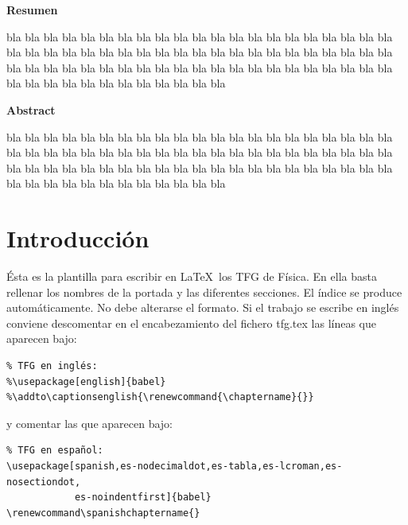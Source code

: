 \documentclass[11pt,a4paper,twoside,pdf]{article}
\numberwithin{equation}{section}
\renewcommand\spanishchaptername{}
\begin{document}
\begin{center}

{\bf Resumen}
\bigskip

\begin{minipage}{0.8\linewidth}
bla bla bla bla bla bla bla bla bla bla bla bla bla bla bla
bla bla bla bla bla bla bla bla bla bla bla bla bla bla bla
bla bla bla bla bla bla bla bla bla bla bla bla bla bla bla 
bla bla bla bla bla bla bla bla bla bla bla bla bla bla bla
bla bla bla bla bla bla bla bla bla bla bla bla bla bla bla
\end{minipage}

\vfill

{\bf Abstract} 
\bigskip

\begin{minipage}{0.8\linewidth}
bla bla bla bla bla bla bla bla bla bla bla bla bla bla bla
bla bla bla bla bla bla bla bla bla bla bla bla bla bla bla
bla bla bla bla bla bla bla bla bla bla bla bla bla bla bla 
bla bla bla bla bla bla bla bla bla bla bla bla bla bla bla
bla bla bla bla bla bla bla bla bla bla bla bla bla bla bla
\end{minipage}

\vfill

\end{center}

\newpage

\tableofcontents

\newpage

\pagestyle{fancy}
\fancyhead[RO,LE]{\leftmark}
\fancyhead[LO,RE]{\thepage}
\fancyfoot{}

\section{Introducción}

Ésta es la plantilla para escribir en \LaTeX\ los TFG de Física. En ella basta rellenar los nombres de la portada y las diferentes secciones. El índice se produce automáticamente. No debe alterarse el formato. Si el trabajo se escribe en inglés conviene descomentar en el encabezamiento del fichero {\sf tfg.tex} las líneas que aparecen bajo:
\begin{verbatim}
% TFG en inglés:
%\usepackage[english]{babel} 
%\addto\captionsenglish{\renewcommand{\chaptername}{}}
\end{verbatim}
y comentar las que aparecen bajo:
\begin{verbatim}
% TFG en español:
\usepackage[spanish,es-nodecimaldot,es-tabla,es-lcroman,es-nosectiondot,
            es-noindentfirst]{babel}
\renewcommand\spanishchaptername{}
\end{verbatim}
\end{document}
